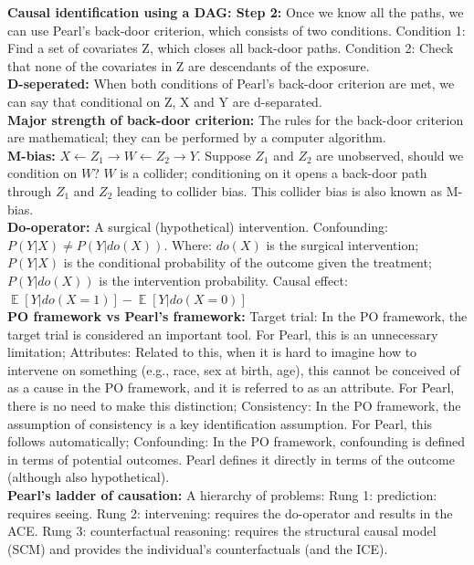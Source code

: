 \documentclass[a4paper,7pt,landscape]{extarticle}
\DeclareMathOperator*{\E}{\mathbb{E}} %
\begin{document}
\begin{multicols}{3}
\begin{boxA}
\textbf{Causal identification using a DAG: Step 2:} Once we know all the paths, we can use Pearl’s back-door criterion, which consists of two conditions. Condition 1: Find a set of covariates Z, which closes all back-door paths. Condition 2: Check that none of the covariates in Z are descendants of the exposure.\\
\textbf{D-seperated:} When both conditions of Pearl's back-door criterion are met, we can say that conditional on Z, X and Y are d-separated.\\
\textbf{Major strength of back-door criterion:} The rules for the back-door criterion are mathematical; they can be performed by a computer algorithm.\\
\textbf{M-bias:} $X \leftarrow Z_1 \rightarrow W \leftarrow Z_2 \rightarrow Y$. Suppose $Z_1$ and $Z_2$ are unobserved, should we condition on $W$? $W$ is a collider; conditioning on it opens a back-door path through $Z_1$ and $Z_2$ leading to collider bias. This collider bias is also known as M-bias.\\
\textbf{Do-operator:} A surgical (hypothetical) intervention. Confounding: $P(Y|X) \neq P(Y|do(X))$. Where: $do(X)$ is the surgical intervention; $P(Y|X)$ is the conditional probability of the outcome given the treatment; $P(Y|do(X))$ is the intervention probability. Causal effect: $\E [Y|do(X = 1)]- \E [Y|do(X = 0)]$\\
\textbf{PO framework vs Pearl's framework:} Target trial: In the PO framework, the target trial is considered an important tool. For Pearl, this is an unnecessary limitation; Attributes: Related to this, when it is hard to imagine how to intervene on something (e.g., race, sex at birth, age), this cannot be conceived of as a cause in the PO framework, and it is referred to as an attribute. For Pearl, there is no need to make this distinction; Consistency: In the PO framework, the assumption of consistency is a key identification assumption. For Pearl, this follows automatically; Confounding: In the PO framework, confounding is defined in terms of potential outcomes. Pearl defines it directly in terms of the outcome (although also hypothetical).\\
\textbf{Pearl’s ladder of causation:} A hierarchy of problems: Rung 1: prediction: requires seeing. Rung 2: intervening: requires the do-operator and results in the ACE. Rung 3: counterfactual reasoning: requires the structural causal model (SCM) and provides the individual’s counterfactuals (and the ICE).\\

\end{boxA}
\end{multicols}
\end{document}
